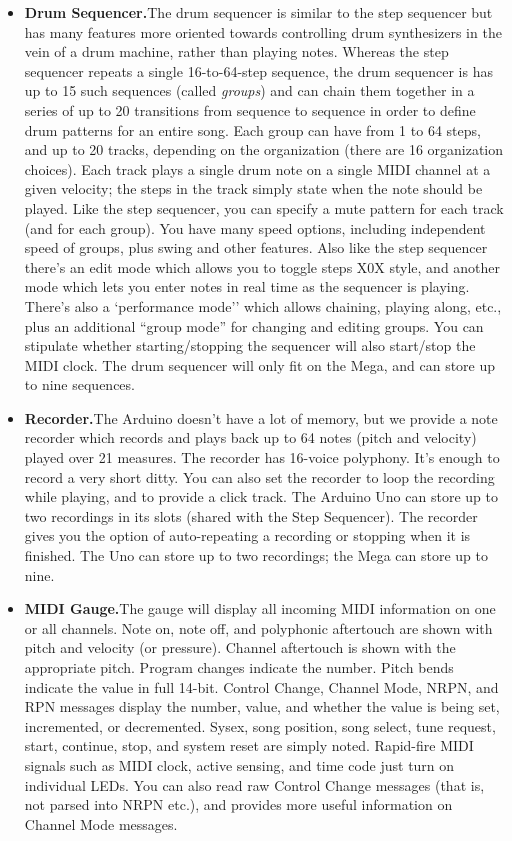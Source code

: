 \documentclass{article}
\begin{document}
\begin{itemize}
\item {\bf Drum Sequencer.}\quad The drum sequencer is similar to the step sequencer but has many features more oriented towards controlling drum synthesizers in the vein of a drum machine, rather than playing notes.  Whereas the step sequencer repeats a single 16-to-64-step sequence, the drum sequencer is has up to 15 such sequences (called {\it groups}) and can chain them together in a series of up to 20 transitions from sequence to sequence in order to define drum patterns for an entire song.  Each group can have from 1 to 64 steps, and up to 20 tracks, depending on the organization (there are 16 organization choices). Each track plays a single drum note on a single MIDI channel at a given velocity; the steps in the track simply state when the note should be played.  Like the step sequencer, you can specify a mute pattern for each track (and for each group). You have many speed options, including independent speed of groups, plus swing and other features.  Also like the step sequencer there's an edit mode which allows you to toggle steps X0X style, and another mode which lets you enter notes in real time as the sequencer is playing.  There's also a `performance mode'' which allows chaining, playing along, etc., plus an additional ``group mode'' for changing and editing groups.  You can stipulate whether starting/stopping the sequencer will also start/stop the MIDI clock.    The drum sequencer will only fit on the Mega, and can store up to nine sequences.

\item {\bf Recorder.}\quad The Arduino doesn't have a lot of memory, but we provide a note recorder which records and plays back up to 64 notes (pitch and velocity) played over 21 measures. The recorder has 16-voice polyphony.   It's enough to record a very short ditty.  You can also set the recorder to loop the recording while playing, and to provide a click track.  The Arduino Uno can store up to two recordings in its slots (shared with the Step Sequencer).  The recorder gives you the option of auto-repeating a recording or stopping when it is finished.  The Uno can store up to two recordings; the Mega can store up to nine.

\item {\bf MIDI Gauge.}\quad The gauge will display all incoming MIDI information on one or all channels.  Note on, note off, and polyphonic aftertouch are shown with pitch and velocity (or pressure).  Channel aftertouch is shown with the appropriate pitch.  Program changes indicate the number.  Pitch bends indicate the value in full 14-bit.  Control Change, Channel Mode, NRPN, and RPN messages display the number, value, and whether the value is being set, incremented, or decremented.  Sysex, song position, song select, tune request, start, continue, stop, and system reset are simply noted.  Rapid-fire MIDI signals such as MIDI clock, active sensing, and time code just turn on individual LEDs. You can also read raw Control Change messages (that is, not parsed into NRPN etc.), and provides more useful information on Channel Mode messages.


\end{itemize}
\end{document}
